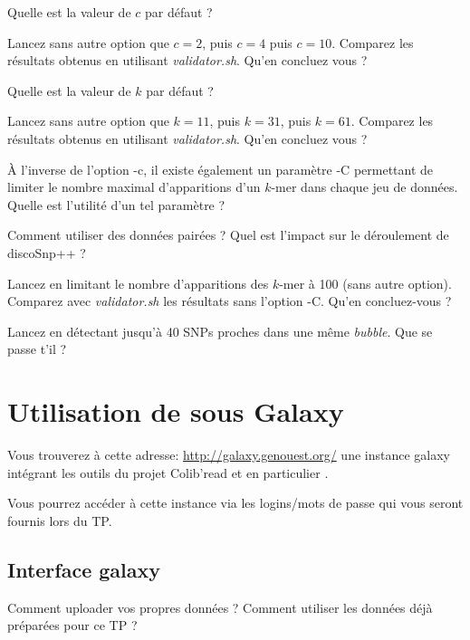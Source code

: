 \qu Quelle est la valeur de $c$ par défaut ?

\qu Lancez \discopp sans autre option que $c=2$, puis $c=4$ puis $c=10$. Comparez les résultats obtenus en utilisant \emph{validator.sh}. Qu'en concluez vous ?


\qu Quelle est la valeur de $k$ par défaut ?

\qu Lancez \discopp sans autre option que $k=11$, puis $k=31$, puis $k=61$. Comparez les résultats obtenus en utilisant \emph{validator.sh}. Qu'en concluez vous ?

\qu À l'inverse de l'option -c, il existe également un paramètre -C permettant de limiter le nombre maximal d'apparitions d'un $k$-mer dans chaque jeu de données. Quelle est l'utilité d'un tel paramètre ? 

\qu Comment utiliser des données pairées ? Quel est l'impact sur le déroulement de discoSnp++ ?

\qu Lancez \discopp en limitant le nombre d'apparitions des $k$-mer à 100 (sans autre option). Comparez avec \emph{validator.sh} les résultats sans l'option -C. Qu'en concluez-vous ?

\qu Lancez \discopp en détectant jusqu'à 40 SNPs proches dans une même \emph{bubble}. Que se passe t'il ? 

\section*{Utilisation de \discopp sous Galaxy}
Vous trouverez à cette adresse: \url{http://galaxy.genouest.org/} une instance galaxy intégrant les outils du projet Colib'read et en particulier \discopp.

Vous pourrez accéder à cette instance via les logins/mots de passe qui vous seront fournis lors du TP. 

\subsection*{Interface galaxy}
\qu {} Comment uploader vos propres données ? Comment utiliser les données déjà préparées pour ce TP ?

